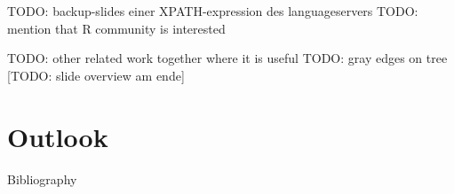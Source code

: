 


\titleframe









\begin{frame}
   TODO: backup-slides einer XPATH-expression des languageservers
   TODO: mention that R community is interested
\end{frame}
\begin{frame}
TODO: other related work together where it is useful
TODO: gray edges on tree
[TODO: slide overview am ende]
\end{frame}


\section[Outlook]{Outlook}
\begin{frame}[c]{\insertsection}
\end{frame}

\begin{frame}{Bibliography}
   \printBibCommand
\end{frame}



